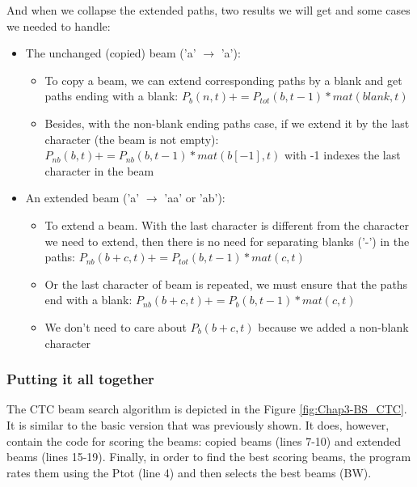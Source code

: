 And when we collapse the extended paths, two results we will get and some cases we needed to handle:
\begin{itemize}
	\item The unchanged (copied) beam ('a' $ \rightarrow $ 'a'):
	      \begin{itemize}
		      \item To copy a beam, we can extend corresponding paths by a blank and get
		            paths ending with a blank: $ P_b (n, t) += P_{tot}(b, t-1)*mat(blank, t) $
		      \item Besides, with the non-blank ending paths case, if we extend it by the last
		            character (the beam is not empty): $ P_{nb}(b,t) += P_{nb}(b,t-1)*mat(b[-1],t) $
		            with -1 indexes the last character in the beam
	      \end{itemize}
	\item An extended beam ('a' $\rightarrow$ 'aa' or 'ab'):
	      \begin{itemize}
		      \item To extend a beam. With the last character is different from the character we need
		            to extend, then there is no need for separating blanks ('-') in the paths:
		            $ P_{nb}(b+c,t) += P_{tot}(b,t-1)*mat(c,t) $
		      \item Or the last character of beam is repeated, we must ensure that the paths
		            end with a blank: $ P_{nb}(b+c,t) += P_b(b,t-1)*mat(c,t) $
		      \item We don't need to care about $P_b(b+c,t)$ because we added a non-blank character
	      \end{itemize}
\end{itemize}

\subsubsection{Putting it all together}

The CTC beam search algorithm is depicted in the Figure \ref{fig:Chap3-BS_CTC}. It is similar to the basic version that was previously shown. It does, however, contain the code for scoring the beams: copied beams (lines 7-10) and extended beams (lines 15-19). Finally, in order to find the best scoring beams, the program rates them using the Ptot (line 4) and then selects the best beams (BW).

